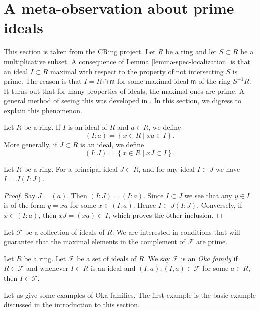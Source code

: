 \section{A meta-observation about prime ideals}
\label{section-oka-families}

\noindent
This section is taken from the CRing project. Let $R$ be a ring and
let $S \subset R$ be a multiplicative subset.
A consequence of
Lemma \ref{lemma-spec-localization}
is that an ideal $I \subset R$ maximal with respect to the property
of not intersecting $S$ is prime. The reason is that $I = R \cap \mathfrak m$
for some maximal ideal $\mathfrak m$ of the ring $S^{-1}R$.
It turns out that for many properties of ideals, the maximal ones
are prime. A general method of seeing this was developed in \cite{Lam-Reyes}.
In this section, we digress to explain this phenomenon.

\medskip\noindent
Let $R$ be a ring. If $I$ is an ideal of $R$ and $a \in R$, we
define
$$
(I : a) = \left\{ x \in R \mid xa \in I\right\}.
$$
More generally, if $J \subset R$ is an ideal, we define
$$
(I : J) = \left\{ x \in R \mid xJ \subset I\right\}.
$$

\begin{lemma}
\label{lemma-colon}
Let $R$ be a ring. For a principal ideal $J \subset R$, and for any ideal
$I \subset J$ we have $I = J (I : J)$.
\end{lemma}

\begin{proof}
Say $J = (a)$. Then $(I : J) = (I : a)$.
Since $I \subset J$ we see that any $y \in I$ is of the form
$y = xa$ for some $x \in (I : a)$. Hence $I \subset J (I : J)$.
Conversely, if $x \in (I : a)$, then $xJ = (xa) \subset I$, which
proves the other inclusion.
\end{proof}

\noindent
Let $\mathcal{F}$ be a collection of ideals of $R$. We are interested in
conditions that will guarantee that the maximal elements in the complement
of $\mathcal{F}$ are prime.

\begin{definition}
\label{definition-oka-family}
Let $R$ be a ring. Let $\mathcal{F}$ be a set of ideals of $R$. We say
$\mathcal{F}$ is an {\it Oka family} if $R \in \mathcal{F}$ and
whenever $I \subset R$ is an ideal and $(I : a), (I, a) \in \mathcal{F}$
for some $a \in R$, then $I \in \mathcal{F}$.
\end{definition}

\noindent
Let us give some examples of Oka families. The first example is the basic
example discussed in the introduction to this section.

